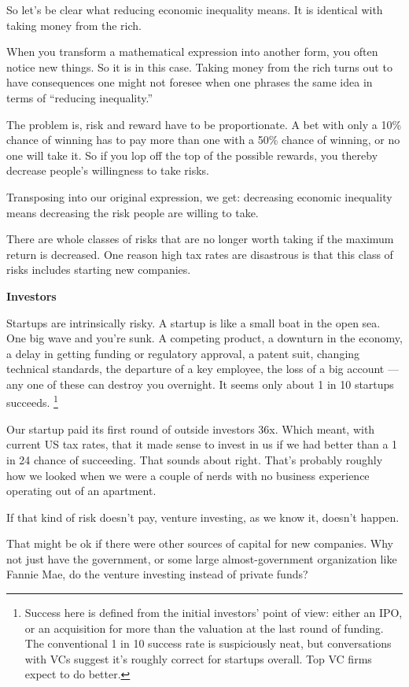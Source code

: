 So let's be clear what reducing economic inequality means. It is
identical with taking money from the rich.

When you transform a mathematical expression into another form, you
often notice new things. So it is in this case. Taking money from the
rich turns out to have consequences one might not foresee when one
phrases the same idea in terms of ``reducing inequality.''

The problem is, risk and reward have to be proportionate. A bet with
only a 10\% chance of winning has to pay more than one with a 50\%
chance of winning, or no one will take it. So if you lop off the top of
the possible rewards, you thereby decrease people's willingness to take
risks.

Transposing into our original expression, we get: decreasing economic
inequality means decreasing the risk people are willing to take.

There are whole classes of risks that are no longer worth taking if the
maximum return is decreased. One reason high tax rates are disastrous is
that this class of risks includes starting new companies.

\textbf{Investors}

Startups are intrinsically risky. A startup is like a small boat in the
open sea. One big wave and you're sunk. A competing product, a downturn
in the economy, a delay in getting funding or regulatory approval, a
patent suit, changing technical standards, the departure of a key
employee, the loss of a big account --- any one of these can destroy you
overnight. It seems only about 1 in 10 startups succeeds.
\footnote{Success here is defined from the initial investors' point of
view: either an IPO, or an acquisition for more than the valuation at
the last round of funding. The conventional 1 in 10 success rate is
suspiciously neat, but conversations with VCs suggest it's roughly
correct for startups overall. Top VC firms expect to do better.}

Our startup paid its first round of outside investors 36x. Which meant,
with current US tax rates, that it made sense to invest in us if we had
better than a 1 in 24 chance of succeeding. That sounds about right.
That's probably roughly how we looked when we were a couple of nerds
with no business experience operating out of an apartment.

If that kind of risk doesn't pay, venture investing, as we know it,
doesn't happen.

That might be ok if there were other sources of capital for new
companies. Why not just have the government, or some large
almost-government organization like Fannie Mae, do the venture investing
instead of private funds?

